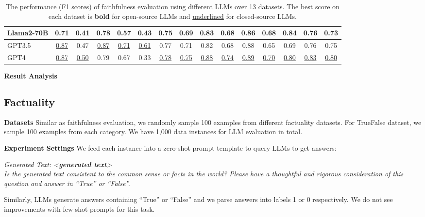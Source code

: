 \begin{table*}[t]
{{\begin{tabular}{l|ccccc|cccc|cc|c|c|c}
Llama2-70B   & 0.71  & 0.41 & 0.78 & 0.57 & 0.43  & \textbf{0.75}  & \textbf{0.69} & 0.83     & 0.68   & \textbf{0.86}  & 0.68  & \textbf{0.84} & \textbf{0.76} & \textbf{0.73} \\ \midrule
GPT3.5       & \underline{0.87}  & 0.47 & \underline{0.87} & \underline{0.71} & \underline{0.61}  & 0.77  & 0.71 & 0.82     & 0.68   & 0.88  & 0.65  & 0.69 & 0.76 & 0.75 \\
GPT4         & \underline{0.87}  & \underline{0.50} & 0.79 & 0.67 & 0.33  & \underline{0.78}  & \underline{0.75} & \underline{0.88}     & \underline{0.74}   & \underline{0.89}  & \underline{0.70}  & \underline{0.80} & \underline{0.83} & \underline{0.80} \\ \bottomrule
\end{tabular}
}}
\caption{The performance (F1 scores) of faithfulness evaluation using different LLMs over 13 datasets. The best score on each dataset is \textbf{bold} for open-source LLMs and \underline{underlined} for closed-source LLMs.}
\label{tab:llm_eval_faithful}
\end{table*}

\textbf{Result Analysis}


\subsection{Factuality}
\textbf{Datasets}
Similar as faithfulness evaluation, we randomly sample 100 examples from different factuality datasets. For TrueFalse dataset, we sample 100 examples from each category. We have 1,000 data instances for LLM evaluation in total.

\textbf{Experiment Settings}
We feed each instance into a zero-shot prompt template to query LLMs to get answers:

\textit{Generated Text: <\textbf{generated text}>\\
Is the generated text consistent to the common sense or facts in the world? Please have a thoughtful and rigorous consideration of this question and answer in ``True'' or ``False''.}

Similarly, LLMs generate answers containing ``True'' or ``False'' and we parse answers into labels 1 or 0 respectively. We do not see improvements with few-shot prompts for this task.


